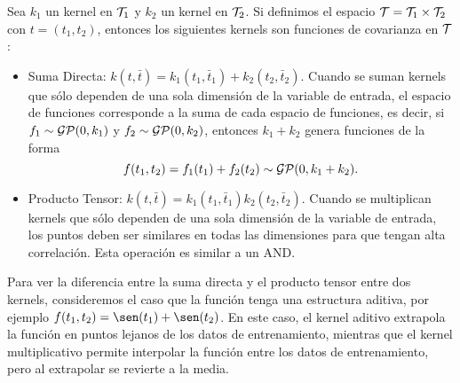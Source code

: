 \begin{proposition}
	Sea \(k_{1}\) un kernel en \(\mathcal{T}_{1}\) y \(k_{2}\) un kernel en \(\mathcal{T}_{2}\). Si definimos el espacio \(\mathcal{T} = \mathcal{T}_{1} \times \mathcal{T}_{2}\) con \(t = (t_{1}, t_{2})\), entonces los siguientes kernels son funciones de covarianza en \(\mathcal{T}\):
	\begin{itemize}
		\item Suma Directa: \(k(t, \bar{t}) = k_{1}(t_{1}, \bar{t}_{1}) + k_{2}(t_{2}, \bar{t}_{2})\). Cuando se suman kernels que sólo dependen de una sola dimensión de la variable de entrada, el espacio de funciones corresponde a la suma de cada espacio de funciones, es decir, si \(f_{1} \sim \operatorname{\mathcal{GP}}(0, k_{1}) \) y \(f_{2} \sim \operatorname{\mathcal{GP}}(0, k_{2})\), entonces \(k_{1} + k_{2}\) genera funciones de la forma
		\[f(t_{1}, t_{2}) = f_{1}(t_{1}) + f_{2}(t_{2}) \sim \operatorname{\mathcal{GP}}(0, k_{1} + k_{2}).\]
		
		\item Producto Tensor: \(k(t, \bar{t}) = k_{1}(t_{1}, \bar{t}_{1}) k_{2}(t_{2}, \bar{t}_{2})\). Cuando se multiplican kernels que sólo dependen de una sola dimensión de la variable de entrada, los puntos deben ser similares en todas las dimensiones para que tengan alta correlación. Esta operación es similar a un \textsc{AND}.
	\end{itemize}
\end{proposition}

Para ver la diferencia entre la suma directa y el producto tensor entre dos kernels, consideremos el caso que la función tenga una estructura aditiva, por ejemplo \(f(t_{1}, t_{2}) = \sen(t_{1}) + \sen(t_{2})\). En este caso, el kernel aditivo extrapola la función en puntos lejanos de los datos de entrenamiento, mientras que el kernel multiplicativo permite interpolar la función entre los datos de entrenamiento, pero al extrapolar se revierte a la media.


